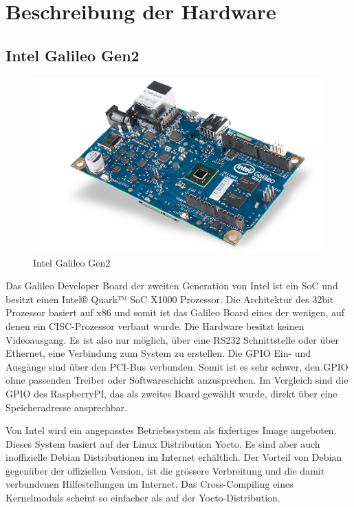 \section{Beschreibung der Hardware}
\label{beschreibung_hardware}
\subsection{Intel Galileo Gen2}

\begin{figure}
\centering
\includegraphics[scale=0.5]{images/iot_galileo.png}
\caption{Intel Galileo Gen2\cite{intel_galileo_image}}
\label{fig:Intel Galileo Gen2}
\end{figure}

Das Galileo Developer Board\cite{intel_datasheet_galileo} der zweiten Generation von
Intel ist ein SoC und besitzt einen Intel® Quark™ SoC X1000 Prozessor. Die Architektur des 32bit Prozessor basiert auf x86\cite{intel_datasheet} und somit ist das Galileo
Board eines der wenigen, auf denen ein CISC-Prozessor verbaut wurde. Die Hardware
besitzt keinen Videoausgang. Es ist also nur möglich, über eine RS232 Schnittstelle oder über Ethernet,
eine Verbindung zum System zu erstellen. Die GPIO Ein- und Ausgänge sind über den
PCI-Bus verbunden. Somit ist es sehr schwer, den GPIO ohne passenden Treiber oder
Softwareschicht anzusprechen. Im Vergleich sind die GPIO des RaspberryPI, das als zweites Board gewählt wurde,
direkt über eine Speicheradresse ansprechbar.
\par
Von Intel wird ein angepasstes Betriebssystem als fixfertiges Image angeboten. Dieses System basiert auf
der Linux Distribution Yocto. Es sind aber auch inoffizielle Debian Distributionen im
Internet erhältlich. Der Vorteil von Debian gegenüber der offiziellen Version, ist die
grössere Verbreitung und die damit verbundenen Hilfestellungen im Internet. Das Cross-Compiling eines Kernelmoduls scheint so einfacher als auf der Yocto-Distribution.


